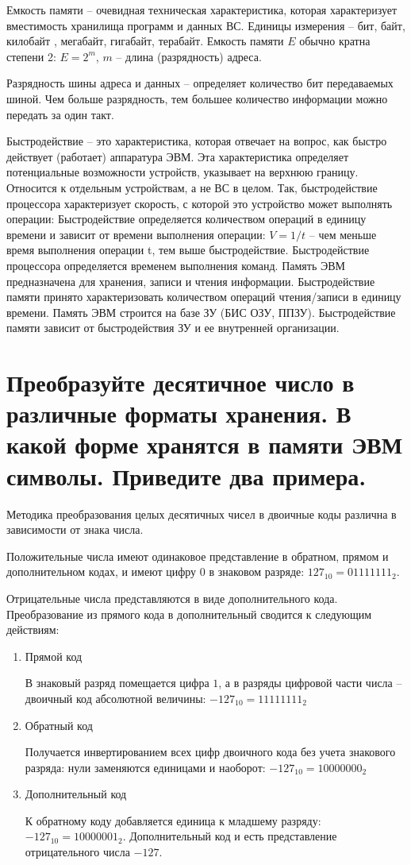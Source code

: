 \documentclass[unicode, 12pt, a4paper, oneside]{article}
\begin{document}
Емкость памяти – очевидная техническая характеристика, которая характеризует вместимость хранилища программ и данных ВС. Единицы измерения – бит,  байт,  килобайт , мегабайт,  гигабайт, терабайт.  Емкость  памяти $ E $ обычно  кратна степени 2: $ E = 2^{m}$, $ m $ – длина (разрядность) адреса.

Разрядность шины адреса и данных – определяет количество бит передаваемых шиной. Чем больше разрядность, тем большее количество информации можно передать за один такт.

Быстродействие – это характеристика, которая отвечает на вопрос, как быстро действует (работает) аппаратура ЭВМ. Эта характеристика определяет потенциальные возможности устройств, указывает на верхнюю границу. Относится к отдельным устройствам, а не ВС в целом. Так, быстродействие процессора характеризует скорость, с которой это устройство может выполнять операции: Быстродействие определяется количеством операций в единицу времени и зависит от времени выполнения операции: $ V=1/t $ – чем меньше время выполнения операции t, тем выше быстродействие. Быстродействие процессора определяется временем выполнения команд. Память ЭВМ предназначена для хранения, записи и чтения информации. Быстродействие памяти принято характеризовать количеством операций чтения/записи в единицу времени. Память ЭВМ строится на базе ЗУ (БИС ОЗУ, ППЗУ). Быстродействие памяти зависит от быстродействия ЗУ и ее внутренней организации. 

\section{Преобразуйте десятичное число в различные форматы хранения. В какой форме хранятся в памяти ЭВМ символы. Приведите два примера.}

Методика преобразования целых десятичных чисел в двоичные коды различна в зависимости от знака числа.

Положительные числа имеют одинаковое представление в обратном, прямом и дополнительном кодах, и имеют цифру $ 0$ в знаковом разряде: $127_{10}=01111111_{2}$.

Отрицательные числа представляются в виде дополнительного кода. Преобразование из прямого кода в дополнительный сводится к следующим действиям:
\begin{enumerate}
\item Прямой код

В знаковый разряд помещается цифра $ 1 $, а в разряды цифровой части числа – двоичный код абсолютной величины: $-127_{10}=11111111_{2}$
\item Обратный код

Получается инвертированием всех цифр двоичного кода без учета знакового разряда: нули заменяются единицами и наоборот: $-127_{10}=10000000_{2}$
\item Дополнительный код

К обратному коду добавляется единица к младшему разряду: $-127_{10}=10000001_{2}$.
Дополнительный код и есть представление отрицательного числа $-127$.
\end{enumerate}  
\end{document}
